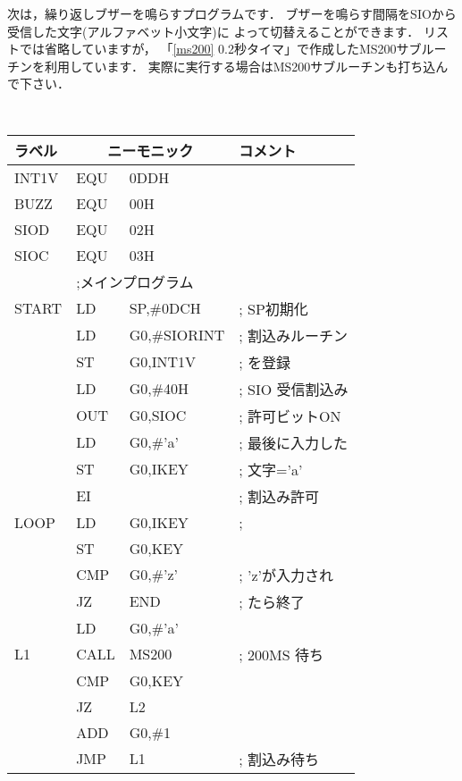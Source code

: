 次は，繰り返しブザーを鳴らすプログラムです．
ブザーを鳴らす間隔をSIOから受信した文字(アルファベット小文字)に
よって切替えることができます．
リストでは省略していますが，
「\ref{ms200} 0.2秒タイマ」で作成したMS200サブルーチンを利用しています．
実際に実行する場合はMS200サブルーチンも打ち込んで下さい．

\begin{center}
{\footnotesize\tt
\begin{tabular}{|l|l l l|} \hline
ラベル & \multicolumn{2}{|c}{ニーモニック} & コメント  \\
\hline
INT1V   & EQU     & 0DDH           & \\
BUZZ    & EQU     & 00H            & \\
SIOD    & EQU     & 02H            & \\
SIOC    & EQU     & 03H            & \\
        & \multicolumn{3}{|l|}{;メインプログラム}        \\
START   & LD      & SP,\#0DCH      & ; SP初期化\\
        & LD      & G0,\#SIORINT   & ; 割込みルーチン\\
        & ST      & G0,INT1V       & ; を登録\\
        & LD      & G0,\#40H       & ; SIO 受信割込み\\
        & OUT     & G0,SIOC        & ; 許可ビットON\\
        & LD      & G0,\#'a'       & ; 最後に入力した\\
        & ST      & G0,IKEY        & ; 文字='a'\\
        & EI      &                & ; 割込み許可\\
LOOP    & LD      & G0,IKEY        & ; \\
        & ST      & G0,KEY         & \\
        & CMP     & G0,\#'z'       & ; 'z'が入力され\\
        & JZ      & END            & ; たら終了\\
        & LD      & G0,\#'a'       & \\
L1      & CALL    & MS200          & ; 200MS 待ち\\
        & CMP     & G0,KEY         & \\
        & JZ      & L2             & \\
        & ADD     & G0,\#1         & \\
        & JMP     & L1             & ; 割込み待ち\\

\end{tabular}}
\end{center}
